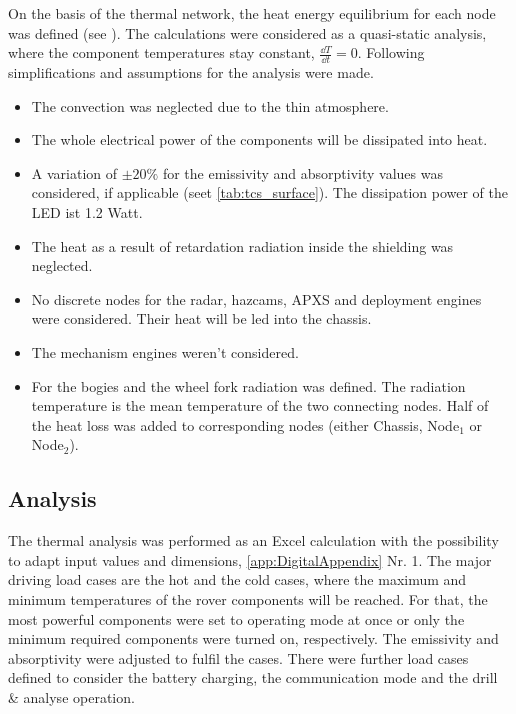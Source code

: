 On the basis of the thermal network, the heat energy equilibrium for each node was defined (see ).
The calculations were considered as a quasi-static analysis, where the component temperatures stay constant, $\frac{\dd T}{\dd t}=0$.
Following simplifications and assumptions for the analysis were made.
\begin{itemize}
	\item The convection was neglected due to the thin atmosphere.
	\item The whole electrical power of the components will be dissipated into heat.
	\item A variation of $\pm 20\%$ for the emissivity and absorptivity values was considered, if applicable (seet \autoref{tab:tcs_surface}). The dissipation power of the LED ist 1.2 Watt.
	\item The heat as a result of retardation radiation inside the shielding was neglected.
	\item No discrete nodes for the radar, hazcams, APXS and deployment engines were considered. Their heat will be led into the chassis.
	\item The mechanism engines weren't considered.
	\item For the bogies  and the wheel fork radiation was defined. The radiation temperature is the mean temperature of the two connecting nodes. Half of the heat loss was added to corresponding nodes (either Chassis, Node$_1$ or Node$_2$).
\end{itemize}


\subsection{Analysis}
The thermal analysis was performed as an Excel calculation with the  possibility to adapt input values and dimensions, \autoref{app:DigitalAppendix} Nr. 1.
The major driving load cases are the  hot and the cold cases, where the maximum and minimum temperatures of the rover components will be reached.
For that, the most powerful components were set to operating mode at once or only the minimum required components were turned on, respectively.
The emissivity and absorptivity were adjusted to fulfil the cases.
There were further load cases defined to consider the  battery charging, the communication mode and the drill \& analyse operation.

